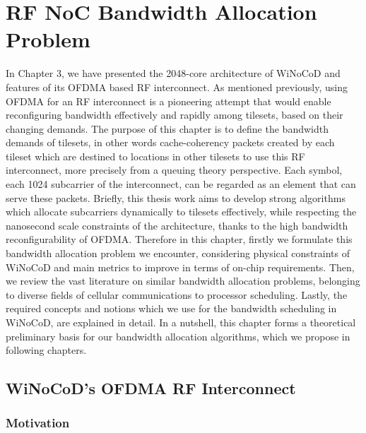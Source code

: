 
\chapter{RF NoC Bandwidth Allocation Problem} %

\label{Chapter4} %



In Chapter 3, we have presented the 2048-core architecture of WiNoCoD and features of its OFDMA based RF interconnect. As mentioned previously, using OFDMA for an RF interconnect is a pioneering attempt that would enable reconfiguring bandwidth effectively and rapidly among tilesets, based on their changing demands. The purpose of this chapter is to define the bandwidth demands of tilesets, in other words cache-coherency packets created by each tileset which are destined to locations in other tilesets to use this RF interconnect, more precisely from a queuing theory perspective. Each symbol, each 1024 subcarrier of the interconnect, can be regarded as an element that can serve these packets. Briefly, this thesis work aims to develop strong algorithms which allocate subcarriers dynamically to tilesets effectively, while respecting the nanosecond scale constraints of the architecture, thanks to the high bandwidth reconfigurability of OFDMA. Therefore in this chapter, firstly we formulate this bandwidth allocation problem we encounter, considering physical constraints of WiNoCoD and main metrics to improve in terms of on-chip requirements. Then, we review the vast literature on similar bandwidth allocation problems, belonging to diverse fields of cellular communications to processor scheduling. Lastly, the required concepts and notions which we use for the bandwidth scheduling in WiNoCoD, are explained in detail. In a nutshell, this chapter forms a theoretical preliminary basis for our bandwidth allocation algorithms, which we propose in following chapters.      


\section{WiNoCoD's OFDMA RF Interconnect }


\subsection{Motivation}

